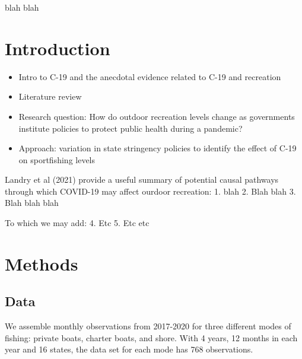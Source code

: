 \documentclass[10pt,letterpaper]{article}
\providecommand{\tightlist}{%
  \setlength{\itemsep}{0pt}\setlength{\parskip}{0pt}}
\begin{document}
blah blah

\hypertarget{introduction}{%
\section{Introduction}\label{introduction}}

\begin{itemize}
\tightlist
\item
  Intro to C-19 and the anecdotal evidence related to C-19 and
  recreation
\item
  Literature review
\item
  Research question: How do outdoor recreation levels change as
  governments institute policies to protect public health during a
  pandemic?
\item
  Approach: variation in state stringency policies to identify the
  effect of C-19 on sportfishing levels
\end{itemize}

Landry et al (2021) provide a useful summary of potential causal
pathways through which COVID-19 may affect ourdoor recreation: 1. blah
2. Blah blah 3. Blah blah blah

To which we may add: 4. Etc 5. Etc etc

\hypertarget{methods}{%
\section{Methods}\label{methods}}

\hypertarget{data}{%
\subsection{Data}\label{data}}

We assemble monthly observations from 2017-2020 for three different
modes of fishing: private boats, charter boats, and shore. With 4 years,
12 months in each year and 16 states, the data set for each mode has 768
observations.
\end{document}
